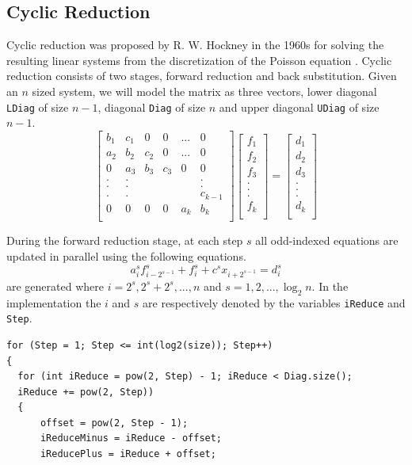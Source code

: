 \documentclass[12pt, oneside]{book}
\theoremstyle{plain}
\theoremstyle{definition}
\begin{document}
\subsection{Cyclic Reduction}\label{cyclic}
Cyclic reduction was proposed by R. W. Hockney in the 1960s for solving the resulting linear systems from the  discretization of the Poisson equation \cite{Hockney}. Cyclic reduction consists of two stages, forward reduction and back substitution. Given an $n$ sized system, we will model the matrix as three vectors, lower diagonal \verb!LDiag! of size $n - 1$, diagonal \verb!Diag! of size $n$ and upper diagonal \verb!UDiag! of size $n - 1$. 
$$
\begin{bmatrix}  
b_1 & c_1 & 0 & 0 & ... & 0 \\ 
a_2 & b_2 & c_2 & 0 & ... & 0 \\ 
0 & a_3 & b_3 & c_3 & 0 & 0 \\ 
. & . &  &  &  & . \\ 
. & . &  &  &  & . \\ 
. & . &  &  &  & c_{k-1} \\ 
0 & 0 & 0 & 0 & a_k & b_k \\ 
\end{bmatrix} \begin{bmatrix}  
f_1 \\ 
f_2 \\ 
f_3 \\ 
.\\ 
.\\ 
.\\ 
f_k \\ 
\end{bmatrix} = \begin{bmatrix} 
d_1 \\ 
d_2 \\ 
d_3 \\ 
.\\ 
.\\ 
.\\ 
d_k \\ 
\end{bmatrix}
$$

During the forward reduction stage, at each step $s$ all odd-indexed equations are updated in parallel using the following equations.
\begin{equation}
a_i^{s} f_{i - 2^{s - 1}}^{s} + f_i^{s} + c^{s}  x_{i + 2^{s - 1}} = d_i^s
\end{equation}
are generated where $ i = 2^s, 2^s + 2^s, ... , n$ and $s = 1, 2, ... , \log_2 n$. In the implementation the $i$ and $s$ are respectively denoted by the variables \verb!iReduce! and \verb!Step!.  
\begin{verbatim}
for (Step = 1; Step <= int(log2(size)); Step++)
{
  for (int iReduce = pow(2, Step) - 1; iReduce < Diag.size();
  iReduce += pow(2, Step))
  {
      offset = pow(2, Step - 1);
      iReduceMinus = iReduce - offset;
      iReducePlus = iReduce + offset;
\end{verbatim}
\end{document}
